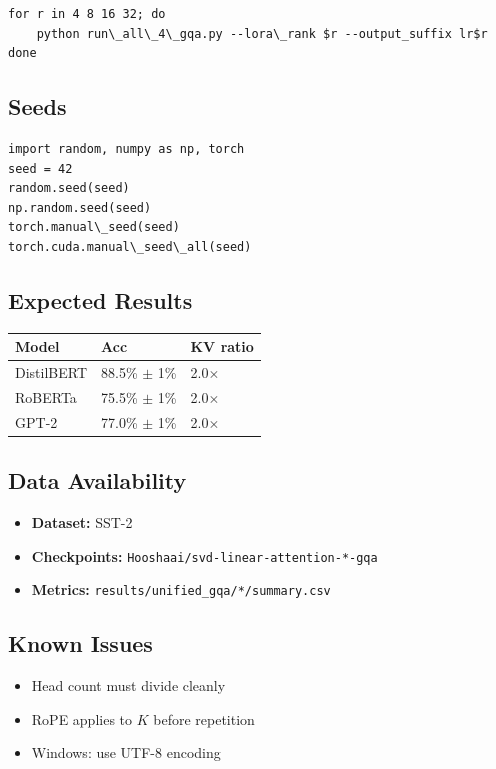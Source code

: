 \begin{lstlisting}
for r in 4 8 16 32; do
    python run\_all\_4\_gqa.py --lora\_rank $r --output_suffix lr$r
done
\end{lstlisting}

\subsection{Seeds}

\begin{lstlisting}
import random, numpy as np, torch
seed = 42
random.seed(seed)
np.random.seed(seed)
torch.manual\_seed(seed)
torch.cuda.manual\_seed\_all(seed)
\end{lstlisting}

\subsection{Expected Results}

\begin{table}[H]
\centering
\small
\begin{tabular}{lll}
\toprule
\textbf{Model} & \textbf{Acc} & \textbf{KV ratio} \\
\midrule
DistilBERT & 88.5\% $\pm$ 1\% & 2.0$\times$ \\
RoBERTa & 75.5\% $\pm$ 1\% & 2.0$\times$ \\
GPT-2 & 77.0\% $\pm$ 1\% & 2.0$\times$ \\
\bottomrule
\end{tabular}
\end{table}

\subsection{Data Availability}

\begin{itemize}
\item \textbf{Dataset:} SST-2
\item \textbf{Checkpoints:} \texttt{Hooshaai/svd-linear-attention-*-gqa}
\item \textbf{Metrics:} \texttt{results/unified\_gqa/*/summary.csv}

\end{itemize}
\subsection{Known Issues}

\begin{itemize}
\item Head count must divide cleanly
\item RoPE applies to $K$ before repetition
\item Windows: use UTF-8 encoding
\end{itemize}